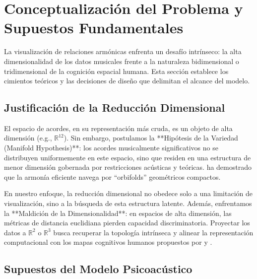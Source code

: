 \section{Conceptualización del Problema y Supuestos Fundamentales}
\label{sec:conceptualizacion}

La visualización de relaciones armónicas enfrenta un desafío intrínseco: la alta dimensionalidad de los datos musicales frente a la naturaleza bidimensional o tridimensional de la cognición espacial humana. Esta sección establece los cimientos teóricos y las decisiones de diseño que delimitan el alcance del modelo.

\subsection{Justificación de la Reducción Dimensional}
\label{subsec:justificacion_reduccion}

El espacio de acordes, en su representación más cruda, es un objeto de alta dimensión (e.g., $\mathbb{R}^{12}$). Sin embargo, postulamos la **Hipótesis de la Variedad (Manifold Hypothesis)**: los acordes musicalmente significativos no se distribuyen uniformemente en este espacio, sino que residen en una estructura de menor dimensión gobernada por restricciones acústicas y teóricas. \citeauthor{tymoczkoGeometryMusicalChords2006} \citep{tymoczkoGeometryMusicalChords2006} ha demostrado que la armonía eficiente navega por ``orbifolds'' geométricos compactos.

En nuestro enfoque, la reducción dimensional no obedece solo a una limitación de visualización, sino a la búsqueda de esta estructura latente. Además, enfrentamos la **Maldición de la Dimensionalidad**: en espacios de alta dimensión, las métricas de distancia euclidiana pierden capacidad discriminatoria. Proyectar los datos a $\mathbb{R}^2$ o $\mathbb{R}^3$ busca recuperar la topología intrínseca y alinear la representación computacional con los mapas cognitivos humanos propuestos por \cite{lerdahlTonalPitchSpace1988} y \cite{krumhanslCognitiveFoundationsMusical1990}.

\subsection{Supuestos del Modelo Psicoacústico}
\label{subsec:supuestos_psicoacusticos}

